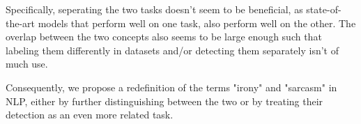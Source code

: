 \documentclass[10pt, a4paper]{article}
\begin{document}
Specifically, seperating the two tasks doesn't seem to be beneficial, as state-of-the-art models that perform well on one task, also perform
well on the other. The overlap between the two concepts also seems to be large enough such that labeling them differently in datasets and/or 
detecting them separately isn't of much use.

Consequently, we propose a redefinition of the terms "irony" and "sarcasm" in NLP, either by further distinguishing between the two or by treating
their detection as an even more related task.

 
\end{document}

